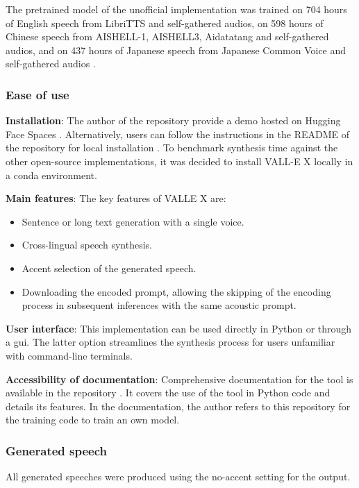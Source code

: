 The pretrained model of the unofficial implementation was trained on 704 hours of English speech from LibriTTS and self-gathered audios, on 598 hours of Chinese speech from  AISHELL-1, AISHELL3, Aidatatang and self-gathered audios, and on 437 hours of Japanese speech from Japanese Common Voice and self-gathered audios \cite{noauthor_demo_nodate}.

\subsubsection{Ease of use}
\textbf{Installation}: The author of the repository provide a demo hosted on Hugging Face Spaces \cite{vallex_hugging_face}. Alternatively, users can follow the instructions in the README of the repository for local installation \cite{songting_vall-e_2023}. To benchmark synthesis time against the other open-source implementations, it was decided to install VALL-E X locally in a conda environment.

\textbf{Main features}:
The key features of VALLE X are:
\begin{itemize}
    \item Sentence or long text generation with a single voice.
    \item Cross-lingual speech synthesis.
    \item Accent selection of the generated speech.
    \item Downloading the encoded prompt, allowing the skipping of the encoding process in subsequent inferences with the same acoustic prompt.
\end{itemize}

\textbf{User interface}:
This implementation can be used directly in Python or through a \gls{gui}. The latter option streamlines the synthesis process for users unfamiliar with command-line terminals.

\textbf{Accessibility of documentation}: Comprehensive documentation for the tool is available in the repository \cite{songting_vall-e_2023}. It covers the use of the tool in Python code and details its features. In the documentation, the author refers to this repository \cite{valle} for the training code to train an own model.

\subsubsection{Generated speech}
All generated speeches were produced using the no-accent setting for the output.

